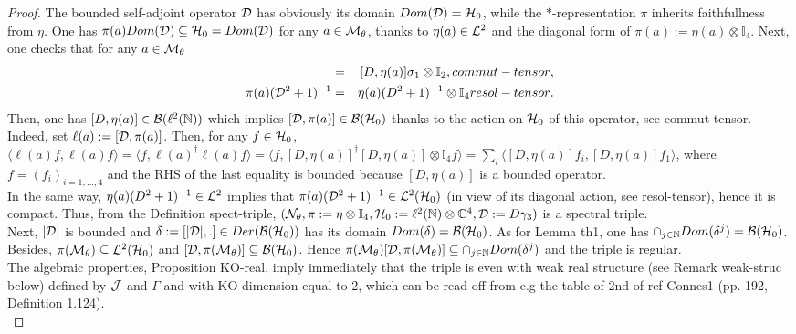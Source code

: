 \documentclass[10pt]{book}
\theoremstyle{break}
\begin{document}
\begin{proof}
The bounded self-adjoint operator ${\cal{D}}$ has obviously its domain $Dom({\cal{D}})={\cal{H}}_0$, while the $*$-representation $\pi$ inherits faithfullness from $\eta$. One has $\pi(a)Dom({\cal{D}})\subseteq {\cal{H}}_0=Dom({\cal{D}})$ for any $a\in{\cal{M}}_\theta$, thanks to $\eta(a)\in{\cal{L}}^2$ and the diagonal form of $\pi(a):=\eta(a)\otimes\mathbb{I}_4$. Next, one checks that for any $a\in{\cal{M}}_\theta$
\begin{eqnarray}
[{\cal{D}},\pi(a)]&=&[D,\eta(a)]\sigma_1\otimes\mathbb{I}_2,{commut-tensor},\\
\pi(a)({\cal{D}}^2+1)^{-1}&=&\eta(a)(D^2+1)^{-1}\otimes\mathbb{I}_4{resol-tensor}.
\end{eqnarray}
Then, one has $[D,\eta(a)]\in{\cal{B}}(\ell^2(\mathbb{N}))$ which implies $[{\cal{D}},\pi(a)]\in{\cal{B}}({\cal{H}}_0)$ thanks to the action on ${\cal{H}}_0$ of this operator, see {commut-tensor}. Indeed, set $\ell(a):=[{\cal{D}},\pi(a)]$. Then, for any $f\in{\cal{H}}_0$, $\langle \ell(a)f ,\ell(a)f \rangle=\langle f ,\ell(a)^\dag\ell(a)f \rangle=\langle f ,[D,\eta(a)]^\dag[D,\eta(a)]\otimes\mathbb{I}_4f \rangle=\sum_i\langle [D,\eta(a)]f_i , [D,\eta(a)]f_1\rangle$, where $f=(f_i)_{i=1,...,4}$ and the RHS of the last equality is bounded because $[D,\eta(a)]$ is a bounded operator. \\
In the same way, $\eta(a)(D^2+1)^{-1}\in{\cal{L}}^2$ implies that $\pi(a)({\cal{D}}^2+1)^{-1}\in{\cal{L}}^2({\cal{H}}_0)$ (in view of its diagonal action, see {resol-tensor}), hence it is compact. Thus, from the Definition {spect-triple}, $({\cal{N}}_\theta,\pi:=\eta\otimes\mathbb{I}_4,{\cal{H}}_0:=\ell^2(\mathbb{N})\otimes\mathbb{C}^4,{\cal{D}}:=D\gamma_3)$ is a spectral triple.\\
Next, $|{\cal{D}}|$ is bounded and $\delta:=[|{\cal{D}}|,.]\in Der({\cal{B}}({\cal{H}}_0))$ has its domain $Dom(\delta)={\cal{B}}({\cal{H}}_0)$. As for Lemma {th1}, one has $\cap_{j\in\mathbb{N}}Dom(\delta^j) ={\cal{B}}({\cal{H}}_0)$. Besides, $\pi({\cal{M}}_\theta)\subseteq{\cal{L}}^2({\cal{H}}_0)$ and $[{\cal{D}},\pi({\cal{M}}_\theta)]\subseteq{\cal{B}}({\cal{H}}_0)$. Hence $\pi({\cal{M}}_\theta)[{\cal{D}},\pi({\cal{M}}_\theta)]\subseteq\cap_{j\in\mathbb{N}}Dom(\delta^j)$ and the triple is regular.\\
The algebraic properties, Proposition {KO-real}, imply immediately that the triple is even with weak real structure (see Remark {weak-struc} below) defined by ${\cal{J}}$ and $\Gamma$ and with KO-dimension equal to 2, which can be read off from e.g the table of 2nd of ref {Connes1} (pp. 192, Definition 1.124).\\

\end{proof}
\end{document}
